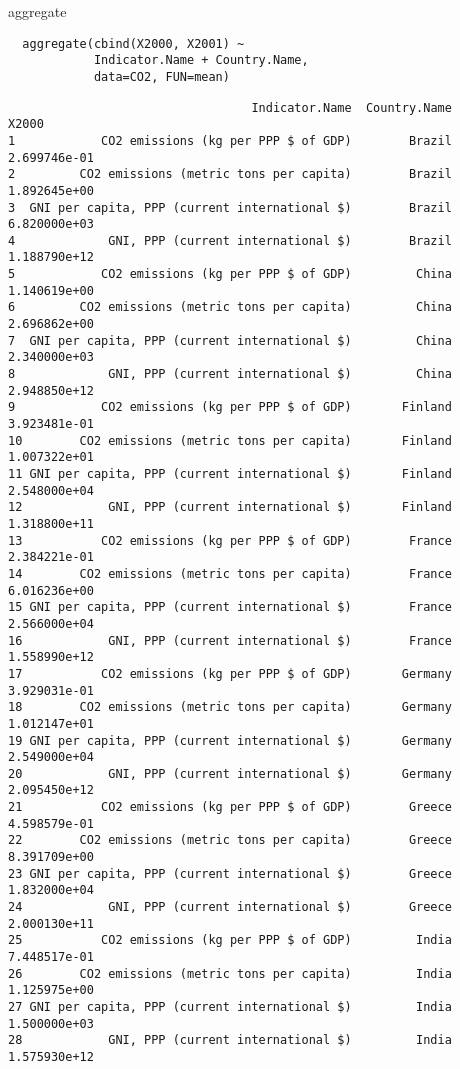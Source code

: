 \documentclass[xcolor={usenames,svgnames,dvipsnames}]{beamer}
\begin{document}
\begin{frame}[fragile,label=sec-3-7]{aggregate}
 \lstset{language=R,label= ,caption= ,numbers=none}
\begin{lstlisting}
  aggregate(cbind(X2000, X2001) ~
            Indicator.Name + Country.Name,
            data=CO2, FUN=mean)
\end{lstlisting}

\begin{verbatim}
                                  Indicator.Name  Country.Name        X2000
1            CO2 emissions (kg per PPP $ of GDP)        Brazil 2.699746e-01
2         CO2 emissions (metric tons per capita)        Brazil 1.892645e+00
3  GNI per capita, PPP (current international $)        Brazil 6.820000e+03
4             GNI, PPP (current international $)        Brazil 1.188790e+12
5            CO2 emissions (kg per PPP $ of GDP)         China 1.140619e+00
6         CO2 emissions (metric tons per capita)         China 2.696862e+00
7  GNI per capita, PPP (current international $)         China 2.340000e+03
8             GNI, PPP (current international $)         China 2.948850e+12
9            CO2 emissions (kg per PPP $ of GDP)       Finland 3.923481e-01
10        CO2 emissions (metric tons per capita)       Finland 1.007322e+01
11 GNI per capita, PPP (current international $)       Finland 2.548000e+04
12            GNI, PPP (current international $)       Finland 1.318800e+11
13           CO2 emissions (kg per PPP $ of GDP)        France 2.384221e-01
14        CO2 emissions (metric tons per capita)        France 6.016236e+00
15 GNI per capita, PPP (current international $)        France 2.566000e+04
16            GNI, PPP (current international $)        France 1.558990e+12
17           CO2 emissions (kg per PPP $ of GDP)       Germany 3.929031e-01
18        CO2 emissions (metric tons per capita)       Germany 1.012147e+01
19 GNI per capita, PPP (current international $)       Germany 2.549000e+04
20            GNI, PPP (current international $)       Germany 2.095450e+12
21           CO2 emissions (kg per PPP $ of GDP)        Greece 4.598579e-01
22        CO2 emissions (metric tons per capita)        Greece 8.391709e+00
23 GNI per capita, PPP (current international $)        Greece 1.832000e+04
24            GNI, PPP (current international $)        Greece 2.000130e+11
25           CO2 emissions (kg per PPP $ of GDP)         India 7.448517e-01
26        CO2 emissions (metric tons per capita)         India 1.125975e+00
27 GNI per capita, PPP (current international $)         India 1.500000e+03
28            GNI, PPP (current international $)         India 1.575930e+12

\end{verbatim}
\end{frame}
\end{document}
